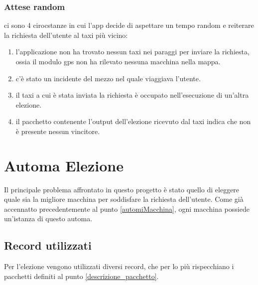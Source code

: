 \subsubsection{Attese random}
ci sono 4 cirocstanze in cui l'app decide di aspettare un tempo random e reiterare la richiesta dell'utente al taxi più vicino:
\begin{enumerate}
	\item l'applicazione non ha trovato nessun taxi nei paraggi per inviare la richiesta, ossia il modulo gps non ha rilevato nessuna macchina nella mappa.
	\item c'è stato un incidente del mezzo nel quale viaggiava l'utente.
	\item il taxi a cui è stata inviata la richiesta è occupato nell'esecuzione di un'altra elezione.
	\item il pacchetto contenente l'output dell'elezione ricevuto dal taxi indica che non è presente nessun vincitore.
\end{enumerate}

\section{Automa Elezione}
Il principale problema affrontato in questo progetto è stato quello di eleggere quale sia la migliore macchina per soddisfare la richiesta dell'utente. Come già accennatto precedentemente al punto \ref{automiMacchina}, ogni macchina possiede un'istanza di questo automa.

\subsection{Record utilizzati}\label{record_elezione}
Per l'elezione vengono utilizzati diversi record, che per lo più rispecchiano i pacchetti definiti al punto \ref{descrizione_pacchetto}.

